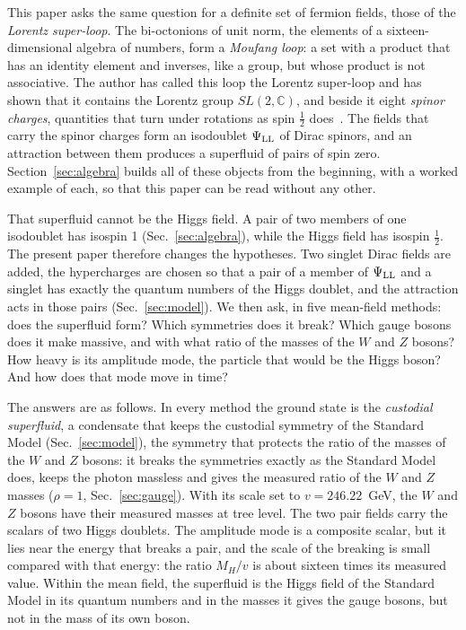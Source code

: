 \documentclass[aps,prd,twocolumn,superscriptaddress,nofootinbib,floatfix,longbibliography]{revtex4-2}
\newcommand{\LL}{{\rm LL}}
\begin{document}
This paper asks the same question for a definite set of fermion fields, those of the \emph{Lorentz super-loop}. The
bi-octonions of unit norm, the elements of a sixteen-dimensional algebra of numbers, form a \emph{Moufang loop}: a set
with a product that has an identity element and inverses, like a group, but whose product is not associative. The author
has called this loop the Lorentz super-loop and has shown that it contains the Lorentz group $SL(2,\mathbb C)$, and
beside it eight \emph{spinor charges}, quantities that turn under rotations as spin $\frac12$ does~\cite{Nash2026}. The
fields that carry the spinor charges form an isodoublet $\Psi_\LL$ of Dirac spinors, and an attraction between them
produces a superfluid of pairs of spin zero. Section~\ref{sec:algebra} builds all of these objects from the beginning,
with a worked example of each, so that this paper can be read without any other.

That superfluid cannot be the Higgs field. A pair of two members of one isodoublet has isospin 1 (Sec.~\ref{sec:algebra}),
while the Higgs field has isospin $\frac12$. The present paper therefore changes the hypotheses. Two singlet Dirac
fields are added, the hypercharges are chosen so that a pair of a member of $\Psi_\LL$ and a singlet has exactly the
quantum numbers of the Higgs doublet, and the attraction acts in those pairs (Sec.~\ref{sec:model}). We then ask, in five
mean-field methods: does the superfluid form? Which symmetries does it break? Which gauge bosons does it make massive,
and with what ratio of the masses of the $W$ and $Z$ bosons? How heavy is its amplitude mode, the particle that would
be the Higgs boson? And how does that mode move in time?

The answers are as follows. In every method the ground state is the \emph{custodial superfluid}, a condensate that
keeps the custodial symmetry of the Standard Model (Sec.~\ref{sec:model}), the symmetry that protects the ratio of the
masses of the $W$ and $Z$ bosons: it breaks the symmetries exactly as the Standard Model does, keeps the photon massless and gives the measured ratio of the $W$ and $Z$ masses
($\rho=1$, Sec.~\ref{sec:gauge}). With its scale set to $v=246.22$~GeV, the $W$ and $Z$ bosons have their measured
masses at tree level. The two pair fields carry the scalars of two Higgs doublets. The amplitude mode is a composite
scalar, but it lies near the energy that breaks a pair, and the scale of the breaking is small compared with that
energy: the ratio $M_H/v$ is about sixteen times its measured value. Within the mean field, the superfluid is the Higgs
field of the Standard Model in its quantum numbers and in the masses it gives the gauge bosons, but not in the mass of
its own boson.
\end{document}
